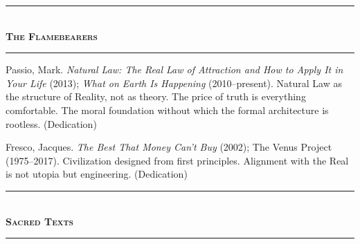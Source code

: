 \documentclass[10pt, openany, oneside]{book}
\renewcommand{\normalsize}{\fontsize{10}{13}\selectfont}
\renewcommand{\footnotesize}{\fontsize{8.5}{11}\selectfont}
\begin{document}
\vspace{1.5em}

\begin{center}
    \rule{0.3\textwidth}{0.4pt}\\[0.5em]
    {\normalsize\bfseries\scshape The Flamebearers}\\[0.3em]
    \rule{0.3\textwidth}{0.4pt}
\end{center}

\vspace{1em}

{\footnotesize

\noindent Passio, Mark. \textit{Natural Law: The Real Law of Attraction and How to Apply It in Your Life} (2013); \textit{What on Earth Is Happening} (2010--present). Natural Law as the structure of Reality, not as theory. The price of truth is everything comfortable. The moral foundation without which the formal architecture is rootless. (Dedication)

\vspace{0.3em}

\noindent Fresco, Jacques. \textit{The Best That Money Can't Buy} (2002); The Venus Project (1975--2017). Civilization designed from first principles. Alignment with the Real is not utopia but engineering. (Dedication)

}

\vspace{1.5em}

\begin{center}
    \rule{0.3\textwidth}{0.4pt}\\[0.5em]
    {\normalsize\bfseries\scshape Sacred Texts}\\[0.3em]
    \rule{0.3\textwidth}{0.4pt}
\end{center}

\vspace{1em}
\end{document}
